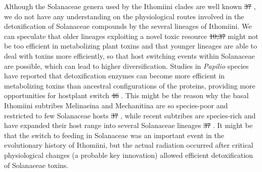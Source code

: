 \documentclass[10pt]{article}
\providecommand{\DIFaddtex}[1]{{\protect\color{blue}\uwave{#1}}} %
\providecommand{\DIFdeltex}[1]{{\protect\color{red}\sout{#1}}}                      %
\providecommand{\DIFaddbegin}{} %
\providecommand{\DIFaddend}{} %
\providecommand{\DIFdelbegin}{} %
\providecommand{\DIFdelend}{} %
\providecommand{\DIFadd}[1]{\texorpdfstring{\DIFaddtex{#1}}{#1}} %
\providecommand{\DIFdel}[1]{\texorpdfstring{\DIFdeltex{#1}}{}} %
\begin{document}
Although the Solanaceae genera used by the Ithomiini clades are well
known \DIFdelbegin %
\DIFdel{37}%
\DIFdelend \DIFaddbegin \DIFadd{\mbox{%
\cite{willmott2006}
}%
}\DIFaddend , we do not have any understanding on the physiological
routes involved in the detoxification of Solanaceae compounds by the
several lineages of Ithomiini. We can speculate that older lineages
exploiting a novel toxic resource \DIFdelbegin %
\DIFdel{10,37}%
\DIFdelend \DIFaddbegin \DIFadd{\mbox{%
\cite{willmott2006,wahlberg2009}
}%
}\DIFaddend might not be too efficient
in metabolizing plant toxins and that younger lineages are able to deal
with toxins more efficiently, so that host switching events within
Solanaceae are possible, which can lead to higher diversification.
Studies in \emph{Papilio} species have reported that detoxification
enzymes can become more efficient in metabolizing toxins than ancestral
configurations of the proteins, providing more opportunities for
hostplant switch \DIFdelbegin %
\DIFdel{46}%
\DIFdelend \DIFaddbegin \DIFadd{\mbox{%
\cite{li2003}
}%
}\DIFaddend . This might be the reason why the basal
Ithomiini subtribes Melinaeina and Mechanitina are so species-poor and
restricted to few Solanaceae hosts \DIFdelbegin %
\DIFdel{37}%
\DIFdelend \DIFaddbegin \DIFadd{\mbox{%
\cite{willmott2006}
}%
}\DIFaddend , while recent subtribes are
species-rich and have expanded their host range into several Solanaceae
lineages \DIFdelbegin %
\DIFdel{37}%
\DIFdelend \DIFaddbegin \DIFadd{\mbox{%
\cite{willmott2006}
}%
}\DIFaddend . It might be that the switch to feeding in Solanaceae
was an important event in the evolutionary history of Ithomiini, but the
actual radiation occurred after critical physiological changes (a
probable key innovation) allowed efficient detoxification of Solanaceae
toxins.
\end{document}
